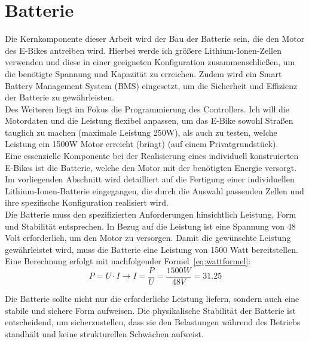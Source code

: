 
\chapter{Batterie}\label{introduction}
Die Kernkomponente dieser Arbeit wird der Bau der Batterie sein, die den Motor des E-Bikes antreiben wird.
Hierbei werde ich größere Lithium-Ionen-Zellen verwenden und diese in einer geeigneten Konfiguration zusammenschließen, um die benötigte Spannung und Kapazität zu erreichen.
Zudem wird ein Smart Battery Management System (BMS) eingesetzt, um die Sicherheit und Effizienz der Batterie zu gewährleisten.\\

Des Weiteren liegt im Fokus die Programmierung des Controllers.
Ich will die Motordaten und die Leistung flexibel anpassen, um das E-Bike sowohl Straßen tauglich zu machen (maximale Leistung 250W), als auch zu testen, welche Leistung ein 1500W Motor erreicht (bringt) (auf einem Privatgrundstück).\\


Eine essenzielle Komponente bei der Realisierung eines individuell konstruierten E-Bikes ist die Batterie, welche den Motor mit der benötigten Energie versorgt.
Im vorliegenden Abschnitt wird detailliert auf die Fertigung einer individuellen Lithium-Ionen-Batterie eingegangen, die durch die Auswahl passenden Zellen und ihre spezifische Konfiguration realisiert wird.\\

Die Batterie muss den spezifizierten Anforderungen hinsichtlich Leistung, Form und Stabilität entsprechen.
In Bezug auf die Leistung ist eine Spannung von 48 Volt erforderlich, um den Motor zu versorgen.
Damit die gewünschte Leistung gewährleistet wird, muss die Batterie eine Leistung von 1500 Watt bereitstellen.
Eine Berechnung erfolgt mit nachfolgender Formel~\ref{eq:wattformel}:
\begin{equation}
    P = U \cdot I \longrightarrow I = \frac{P}{U}= \frac{1500W}{48V}= 31.25
    \label{eq:wattformel}
\end{equation}
\label{introduction2}

Die Batterie sollte nicht nur die erforderliche Leistung liefern, sondern auch eine stabile und sichere Form aufweisen.
Die physikalische Stabilität der Batterie ist entscheidend, um sicherzustellen, dass sie den Belastungen während des Betriebs standhält und keine strukturellen Schwächen aufweist.\\

